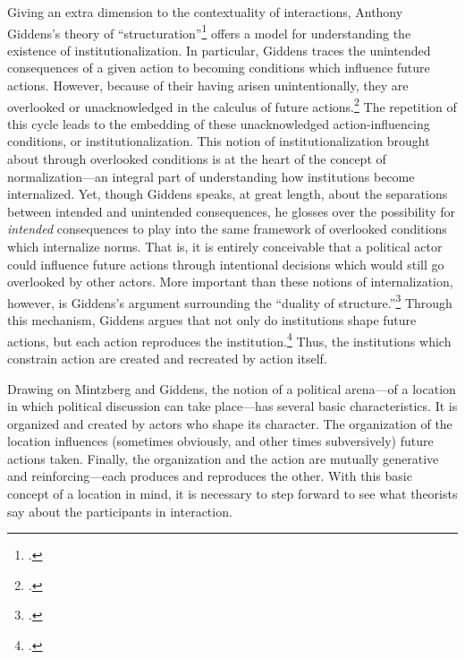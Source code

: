 \documentclass{article}
\begin{document}
Giving an extra dimension to the contextuality of interactions, Anthony Giddens's theory of ``structuration''\footcite{giddens86} offers a model for understanding the existence of institutionalization.
In particular, Giddens traces the unintended consequences of a given action to becoming conditions which influence future actions.
However, because of their having arisen unintentionally, they are overlooked or unacknowledged in the calculus of future actions.\footcite[5]{giddens86}
The repetition of this cycle leads to the embedding of these unacknowledged action-influencing conditions, or institutionalization.
This notion of institutionalization brought about through overlooked conditions is at the heart of the concept of normalization---an integral part of understanding how institutions become internalized.
Yet, though Giddens speaks, at great length, about the separations between intended and unintended consequences, he glosses over the possibility for \emph{intended} consequences to play into the same framework of overlooked conditions which internalize norms.
That is, it is entirely conceivable that a political actor could influence future actions through intentional decisions which would still go overlooked by other actors. 
More important than these notions of internalization, however, is Giddens's argument surrounding the ``duality of structure.''\footcite[16]{giddens86}
Through this mechanism, Giddens argues that not only do institutions shape future actions, but each action reproduces the institution.\footcite[19]{giddens86}
Thus, the institutions which constrain action are created and recreated by action itself.

Drawing on Mintzberg and Giddens, the notion of a political arena---of a location in which political discussion can take place---has several basic characteristics.
It is organized and created by actors who shape its character.
The organization of the location influences (sometimes obviously, and other times subversively) future actions taken.
Finally, the organization and the action are mutually generative and reinforcing---each produces and reproduces the other.
With this basic concept of a location in mind, it is necessary to step forward to see what theorists say about the participants in interaction.
\end{document}
